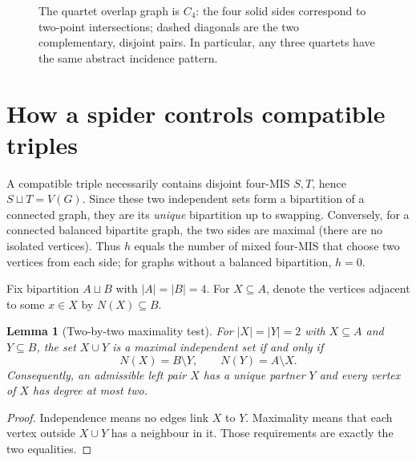\documentclass[12pt,a4paper]{article}
\newtheorem{lemma}[theorem]{Lemma}
\begin{document}
\begin{figure}[htbp]\centering
{}
\caption{The quartet overlap graph is $C_4$: the four solid sides correspond to two-point intersections; dashed diagonals are the two complementary, disjoint pairs. In particular, any three quartets have the same abstract incidence pattern.}\label{fig:c4}
\end{figure}

\section{How a spider controls compatible triples}\label{sec:graph}
A compatible triple necessarily contains disjoint four-MIS $S,T$, hence $S\sqcup T=V(G)$. Since these two independent sets form a bipartition of a connected graph, they are its \emph{unique} bipartition up to swapping. Conversely, for a connected balanced bipartite graph, the two sides are maximal (there are no isolated vertices). Thus $h$ equals the number of mixed four-MIS that choose two vertices from each side; for graphs without a balanced bipartition, $h=0$.

Fix bipartition $A\sqcup B$ with $|A|=|B|=4$. For $X\subseteq A$, denote the vertices adjacent to some $x\in X$ by $N(X)\subseteq B$.
\begin{lemma}[Two-by-two maximality test]\label{lem:test}
For $|X|=|Y|=2$ with $X\subseteq A$ and $Y\subseteq B$, the set $X\cup Y$ is a maximal independent set if and only if
\begin{equation}\label{eq:test}N(X)=B\setminus Y,\qquad N(Y)=A\setminus X.\end{equation}
Consequently, an admissible left pair $X$ has a \emph{unique} partner $Y$ and every vertex of $X$ has degree at most two.
\end{lemma}
\begin{proof}
Independence means no edges link $X$ to $Y$. Maximality means that each vertex outside $X\cup Y$ has a neighbour in it. Those requirements are exactly the two equalities.
\end{proof}
\end{document}
